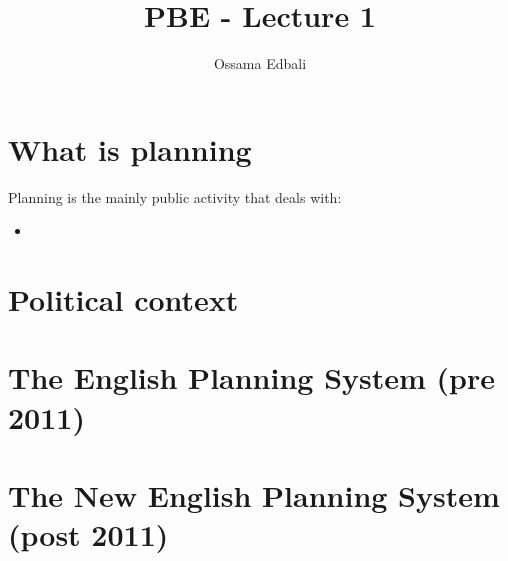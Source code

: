 \documentclass{article}
\title{PBE - Lecture 1}
\author{Ossama Edbali}
\begin{document}
	
	\section{What is planning}
	Planning is the mainly public activity that deals with:
	\begin{itemize}
		\item 
	\end{itemize}		
	
	\section{Political context}
	
	\section{The English Planning System (pre 2011)}
	
	\section{The New English Planning System (post 2011)}	
	
\end{document}
